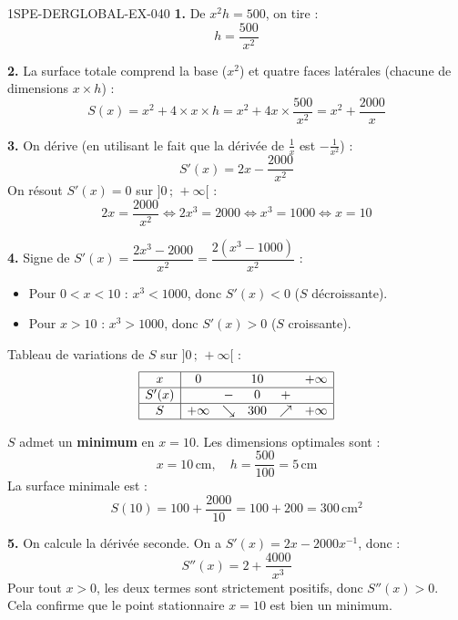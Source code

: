 \begin{corrige}{1SPE-DERGLOBAL-EX-040}
\textbf{1.} De $x^2 h = 500$, on tire :
\[
h = \frac{500}{x^2}
\]

\textbf{2.} La surface totale comprend la base ($x^2$) et quatre faces latérales (chacune de dimensions $x \times h$) :
\[
S(x) = x^2 + 4 \times x \times h = x^2 + 4x \times \frac{500}{x^2} = x^2 + \frac{2000}{x}
\]

\textbf{3.} On dérive (en utilisant le fait que la dérivée de $\frac{1}{x}$ est $-\frac{1}{x^2}$) :
\[
S'(x) = 2x - \frac{2000}{x^2}
\]
On résout $S'(x) = 0$ sur $]0\,;\,+\infty[$ :
\[
2x = \frac{2000}{x^2} \iff 2x^3 = 2000 \iff x^3 = 1000 \iff x = 10
\]

\textbf{4.} Signe de $S'(x) = \dfrac{2x^3 - 2000}{x^2} = \dfrac{2(x^3 - 1000)}{x^2}$ :
\begin{itemize}
\item Pour $0 < x < 10$ : $x^3 < 1000$, donc $S'(x) < 0$ ($S$ décroissante).
\item Pour $x > 10$ : $x^3 > 1000$, donc $S'(x) > 0$ ($S$ croissante).
\end{itemize}

Tableau de variations de $S$ sur $]0\,;\,+\infty[$ :
\[
\begin{array}{|c|ccccc|}
\hline
x & 0 & & 10 & & +\infty \\
\hline
S'(x) & & - & 0 & + & \\
\hline
S & +\infty & \searrow & 300 & \nearrow & +\infty \\
\hline
\end{array}
\]

$S$ admet un \textbf{minimum} en $x = 10$. Les dimensions optimales sont :
\[
x = 10\,\text{cm}, \quad h = \frac{500}{100} = 5\,\text{cm}
\]
La surface minimale est :
\[
S(10) = 100 + \frac{2000}{10} = 100 + 200 = \boxed{300\,\text{cm}^2}
\]

\textbf{5.} On calcule la dérivée seconde. On a $S'(x) = 2x - 2000x^{-1}$, donc :
\[
S''(x) = 2 + \frac{4000}{x^3}
\]
Pour tout $x > 0$, les deux termes sont strictement positifs, donc $S''(x) > 0$. Cela confirme que le point stationnaire $x = 10$ est bien un minimum.
\end{corrige}

